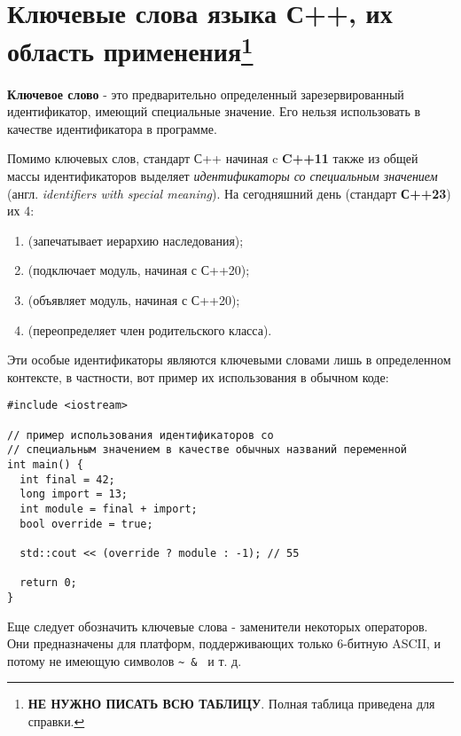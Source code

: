 \section{Ключевые слова языка С++, их область применения\footnote{\textbf{НЕ НУЖНО ПИСАТЬ ВСЮ ТАБЛИЦУ}. Полная таблица приведена для справки.}}

\textbf{Ключевое слово} - это предварительно определенный
зарезервированный идентификатор, имеющий специальные значение. Его
нельзя использовать в качестве идентификатора в программе.

Помимо ключевых слов, стандарт С++ начиная c \textbf{C++11} также из
общей массы идентификаторов выделяет \emph{идентификаторы со специальным
значением} (англ. \emph{identifiers with special meaning}). На
сегодняшний день (стандарт \textbf{С++23}) их 4:
\begin{enumerate}
  \item {} (запечатывает иерархию наследования);
  \item {} (подключает модуль, начиная с С++20);
  \item {} (объявляет модуль, начиная с С++20);
  \item {} (переопределяет член родительского класса).
\end{enumerate}

Эти особые идентификаторы являются ключевыми словами лишь в определенном
контексте, в частности, вот пример их использования в обычном коде:
\begin{verbatim}
#include <iostream>

// пример использования идентификаторов со
// специальным значением в качестве обычных названий переменной
int main() {
  int final = 42;
  long import = 13;
  int module = final + import;
  bool override = true;

  std::cout << (override ? module : -1); // 55

  return 0;
}
\end{verbatim}

Еще следует обозначить ключевые слова - заменители некоторых операторов.
Они предназначены для платформ, поддерживающих только 6-битную ASCII, и
потому не имеющую символов \texttt{\textasciitilde{}\ \&\ \textbar{}} и
т. д.

